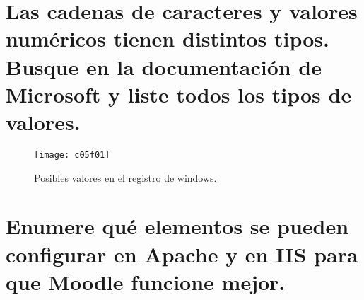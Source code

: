 \section{Las cadenas de caracteres y valores numéricos tienen distintos	tipos. Busque en la documentación de Microsoft y liste todos los tipos de valores. \cite{c05c01}}

\begin{figure}[H]
	\centering
	\texttt{[image: c05f01]}
	\caption{Posibles valores en el registro de windows.}
	\label{fig:c05f01}
\end{figure}


\section{Enumere qué elementos se pueden configurar en Apache y en IIS para que Moodle funcione mejor. \cite{c06c01}}

